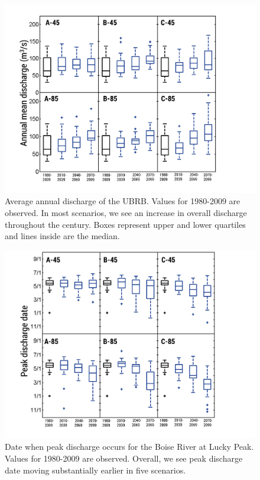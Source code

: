 \documentclass[11pt,letterpaper]{article}
\begin{document}
\begin{figure}
\centering
\includegraphics[width=\textwidth]{figure-files/figure8.png}
\caption{Average annual discharge of the UBRB. Values for 1980-2009 are observed. In most scenarios, we see an increase in overall discharge throughout the century. Boxes represent upper and lower quartiles and lines inside are the median.}
\label{fig:BoxPlotDischarge}
\end{figure}
\clearpage

\begin{figure}
\centering
\includegraphics[width=\textwidth]{figure-files/figure9.png}
\caption{Date when peak discharge occurs for the Boise River at Lucky Peak. Values for 1980-2009 are observed. Overall, we see peak discharge date moving substantially earlier in five scenarios.}
\label{fig:PeakDischargeDate}
\end{figure}
\clearpage
\end{document}
